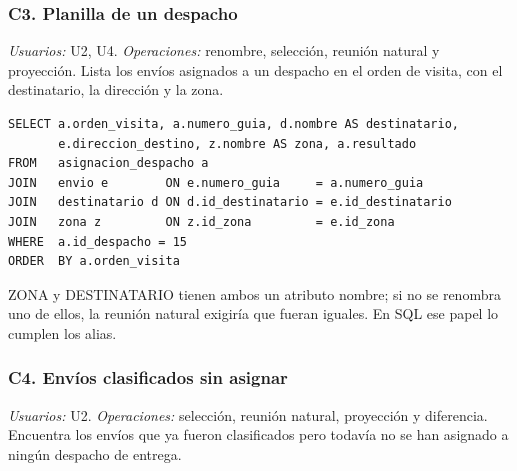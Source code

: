 \subsubsection{C3. Planilla de un despacho}
\label{q:C3}
\textit{Usuarios:} U2, U4. \textit{Operaciones:} renombre, selección, reunión natural y proyección. Lista los envíos asignados a un despacho en el orden de visita, con el destinatario, la dirección y la zona.

\begin{center}\end{center}

\begin{lstlisting}[style=sqlpro]
SELECT a.orden_visita, a.numero_guia, d.nombre AS destinatario,
       e.direccion_destino, z.nombre AS zona, a.resultado
FROM   asignacion_despacho a
JOIN   envio e        ON e.numero_guia     = a.numero_guia
JOIN   destinatario d ON d.id_destinatario = e.id_destinatario
JOIN   zona z         ON z.id_zona         = e.id_zona
WHERE  a.id_despacho = 15
ORDER  BY a.orden_visita
\end{lstlisting}
ZONA y DESTINATARIO tienen ambos un atributo nombre; si no se renombra uno de ellos, la reunión natural exigiría que fueran iguales. En SQL ese papel lo cumplen los alias.


\subsubsection{C4. Envíos clasificados sin asignar}
\label{q:C4}
\textit{Usuarios:} U2. \textit{Operaciones:} selección, reunión natural, proyección y diferencia. Encuentra los envíos que ya fueron clasificados pero todavía no se han asignado a ningún despacho de entrega.

\begin{center}\end{center}

